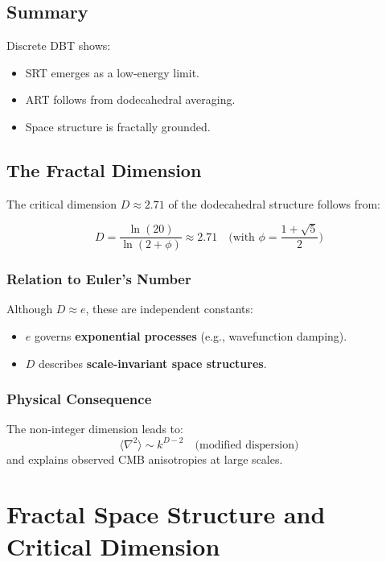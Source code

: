 \subsection{Summary}  
Discrete DBT shows:  
\begin{itemize}  
\item SRT emerges as a low-energy limit.  
\item ART follows from dodecahedral averaging.  
\item Space structure is fractally grounded.  
\end{itemize}  

\subsection{The Fractal Dimension}  
\label{subsec:fractal_dimension}  

The critical dimension $D \approx 2.71$ of the dodecahedral structure follows from:  

\begin{equation}  
D = \frac{\ln(20)}{\ln(2 + \phi)} \approx 2.71 \quad \text{(with } \phi = \frac{1 + \sqrt{5}}{2}\text{)}  
\end{equation}  

\subsubsection*{Relation to Euler's Number}  
Although $D \approx e$, these are independent constants:  
\begin{itemize}  
\item $e$ governs \textbf{exponential processes} (e.g., wavefunction damping).  
\item $D$ describes \textbf{scale-invariant space structures}.  
\end{itemize}  

\subsubsection*{Physical Consequence}  
The non-integer dimension leads to:  
\begin{equation}  
\langle \nabla^2 \rangle \sim k^{D-2} \quad \text{(modified dispersion)}  
\end{equation}  
and explains observed CMB anisotropies at large scales.  

\section{Fractal Space Structure and Critical Dimension}  
\label{sec:fractal_structure}  

